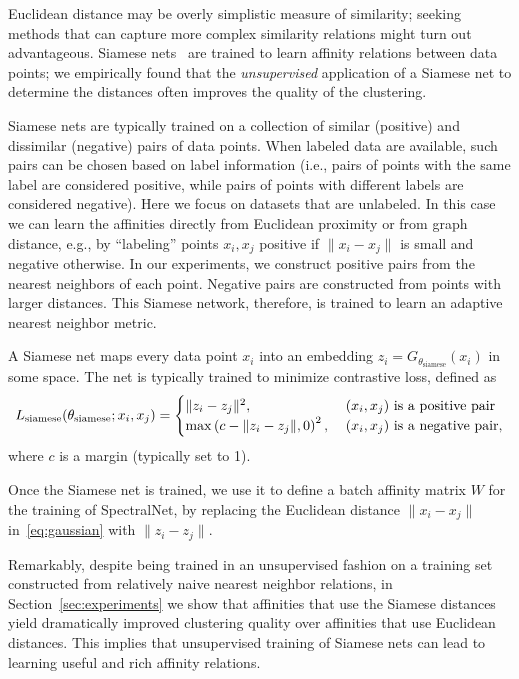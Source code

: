 \documentclass{article} %
\begin{document}
Euclidean distance may be overly simplistic measure of similarity; seeking methods that can capture more complex similarity relations might turn out advantageous.
Siamese nets~\citep{hadsell2006dimensionality, shaham2018learning} are trained to learn affinity relations between data points; we empirically found that the \textit{unsupervised} application of a Siamese net to determine the distances often improves the quality of the clustering.

Siamese nets are typically trained on a collection of similar (positive) and dissimilar (negative) pairs of data points. When labeled data are available, such pairs can be chosen based on label information (i.e., pairs of points with the same label are considered positive, while pairs of points with different labels are considered negative). Here we focus on datasets that are unlabeled.
In this case we can learn the affinities directly from Euclidean proximity or from graph distance, e.g., by ``labeling'' points $x_i,x_j$ positive if $\|x_i-x_j\|$ is small and negative otherwise.
In our experiments, we construct positive pairs from the nearest neighbors of each point. Negative pairs are constructed from points with larger distances. This Siamese network, therefore, is trained to learn an adaptive nearest neighbor metric.

A Siamese net maps every data point $x_i$ into an embedding $z_i = G_{\theta_\text{siamese}}(x_i)$ in some space. The net is typically trained to minimize contrastive loss, defined as
\begin{equation}
L_\text{siamese}(\theta_\text{siamese}; x_i,x_j) = \begin{cases}
\|z_i-z_j\|^2,\; &\text{$(x_i,x_j)$ is a positive pair}\notag\\
\max\left(c-\|z_i-z_j\|,0\right)^2,\; &\text{$(x_i,x_j)$ is a negative pair},\notag
\end{cases}
\end{equation}
where $c$ is a margin (typically set to 1).

Once the Siamese net is trained, we use it to define a batch affinity matrix $W$ for the training of SpectralNet, by replacing the Euclidean distance $\|x_i-x_j\|$ in~\eqref{eq:gaussian} with $\|z_i-z_j\|$.

Remarkably, despite being trained in an unsupervised fashion on a training set constructed from relatively naive nearest neighbor relations, in Section~\ref{sec:experiments} we show that affinities that use the Siamese distances yield dramatically improved clustering quality over affinities that use Euclidean distances. This implies that unsupervised training of Siamese nets can lead to learning useful and rich affinity relations.
\end{document}
